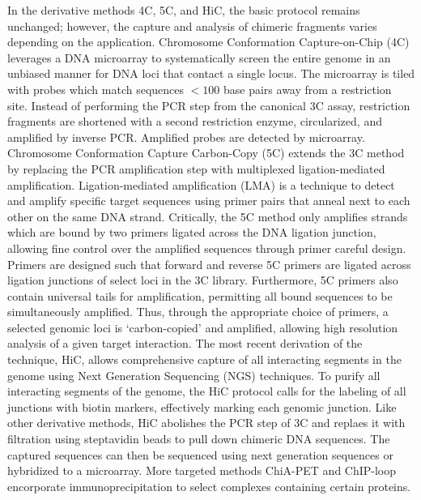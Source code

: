 \documentclass[phd,tocprelim]{cornell}
\begin{document}
%
%

In the derivative methods 4C, 5C, and HiC, the basic protocol remains
unchanged; however, the capture and analysis of chimeric fragments varies
depending on the application.  Chromosome Conformation Capture-on-Chip (4C)
leverages a DNA microarray to systematically screen the entire genome in an
unbiased manner for DNA loci that contact a single locus\cite{simonis2006}.
The microarray is tiled with probes which match sequences $< 100$ base pairs
away from a restriction site.  Instead of performing the PCR step from the
canonical 3C assay, restriction fragments are shortened with a second restriction
enzyme, circularized, and amplified by inverse PCR\@.  Amplified probes
are detected by microarray\cite{simonis2006}.  Chromosome Conformation Capture Carbon-Copy (5C)
extends the 3C method by replacing the PCR amplification step with multiplexed
ligation-mediated amplification.  Ligation-mediated amplification (LMA) is a
technique to detect and amplify specific target sequences using primer pairs
that anneal next to each other on the same DNA strand\cite{dostie2006}.
Critically, the 5C method only amplifies strands which are bound by two
primers ligated across the DNA ligation junction, allowing fine control over
the amplified sequences through primer careful design.  Primers are
designed such that forward and reverse 5C primers are ligated across ligation
junctions of select loci in the 3C library.
Furthermore, 5C primers also contain universal tails for amplification,
permitting all bound sequences to be simultaneously amplified.  Thus, through
the appropriate choice of primers, a selected genomic loci is `carbon-copied'
and amplified, allowing high resolution analysis of a given target
interaction\cite{dostie2006}.  The most recent derivation of the technique,
HiC, allows comprehensive capture of all interacting segments in the genome
using Next Generation Sequencing (NGS) techniques.  To purify all interacting
segments of the genome, the HiC protocol calls for the labeling of all junctions
with biotin markers, effectively marking each genomic junction. Like other
derivative methods, HiC abolishes the PCR step of 3C and replaes it with filtration
using steptavidin beads to pull down chimeric DNA sequences.  The captured sequences
can then be sequenced using next generation sequences or hybridized to a
microarray.  More targeted methods ChiA-PET and ChIP-loop encorporate
immunoprecipitation to select complexes containing certain proteins.
\end{document}
